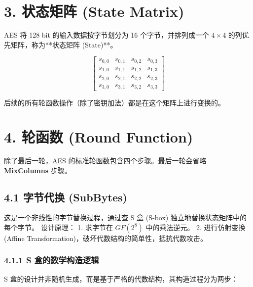 \documentclass[12pt, a4paper]{article}
\begin{document}
\section{\color{aesblue}3. 状态矩阵 (State Matrix)}

AES 将 128 bit 的输入数据按字节划分为 16 个字节，并排列成一个 $4 \times 4$ 的列优先矩阵，称为**状态矩阵 (State)**。

\begin{tcolorbox}[mathbox]
$$
\begin{bmatrix}
s_{0,0} & s_{0,1} & s_{0,2} & s_{0,3} \\
s_{1,0} & s_{1,1} & s_{1,2} & s_{1,3} \\
s_{2,0} & s_{2,1} & s_{2,2} & s_{2,3} \\
s_{3,0} & s_{3,1} & s_{3,2} & s_{3,3}
\end{bmatrix}
$$
\end{tcolorbox}
后续的所有轮函数操作（除了密钥加法）都是在这个矩阵上进行变换的。

\section{\color{aesblue}4. 轮函数 (Round Function)}

除了最后一轮，AES 的标准轮函数包含四个步骤。最后一轮会省略 \textbf{MixColumns} 步骤。

\subsection{4.1 字节代换 (SubBytes)}
这是一个非线性的字节替换过程，通过查 S 盒 (S-box) 独立地替换状态矩阵中的每个字节。
设计原理：
1. 求字节在 $GF(2^8)$ 中的乘法逆元。
2. 进行仿射变换 (Affine Transformation)，破坏代数结构的简单性，抵抗代数攻击。
\subsubsection{4.1.1 S 盒的数学构造逻辑}

S 盒的设计并非随机生成，而是基于严格的代数结构，其构造过程分为两步：
\end{document}
